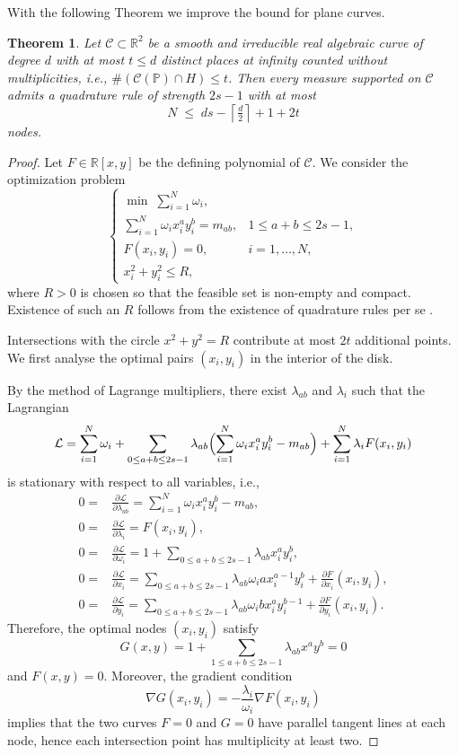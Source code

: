 \documentclass[11pt,a4paper]{amsart}
\numberwithin{equation}{section}
\newtheorem{thm}{Theorem}
\theoremstyle{definition}
\newcommand{\R}{\mathbb{R}}
\numberwithin{thm}{section}
\theoremstyle{break}
\numberwithin{subcase}{case}
\begin{document}
With the  following Theorem we improve the  bound for plane curves.

\begin{thm}\label{prop:planecurve}
Let $\mathcal{C}\subset \R^2$ be a smooth {and irreducible} real algebraic curve of degree $d$ with at most $t \leq d$ {distinct} places at infinity {counted without multiplicities, i.e., $\#(\mathcal C(\mathbb P)\cap H)\leq t$}. Then every measure supported on $\mathcal C$ admits a quadrature rule of strength $2s-1$ with at most
\[
N \;\le\; ds - \left\lceil \tfrac d2 \right\rceil + 1 + 2t
\]
nodes.
\end{thm}
\begin{proof}
Let $F \in \R[x,y]$ be the defining polynomial of $\mathcal{C}$. We consider the optimization problem
\[
\begin{cases}
\min \; \sum_{i=1}^N \omega_i, \\[2pt]
\sum_{i=1}^N \omega_i x_i^a y_i^b = m_{ab}, & 1 \le a+b \le 2s-1, \\
F(x_i,y_i)=0, & i=1,\dots,N, \\
x_i^2 + y_i^2 \le R,
\end{cases}
\]
where $R>0$ is chosen so that the feasible set is non-empty and compact.   
Existence of such an $R$  follows from the existence of quadrature rules per se \cite{richter1957parameterfreie}. 

Intersections with the circle $x^2+y^2=R$ contribute at most $2t$ additional points. We first analyse the optimal pairs $(x_i,y_i)$ in the interior of the disk.

By the method of Lagrange multipliers, there exist $\lambda_{ab}$ and $\lambda_i$ such that the Lagrangian  
\[
\mathcal{L} = \sum_{i=1}^N \omega_i 
+ \sum_{0\le a+b\le 2s-1} \lambda_{ab} \Bigl(\sum_{i=1}^N \omega_i x_i^a y_i^b - m_{ab}\Bigr) 
+ \sum_{i=1}^N \lambda_i F(x_i,y_i)
\]
is stationary with respect to all variables, i.e.,
{\begin{align*}
    0=&\frac{\partial \mathcal L}{\partial \lambda_{ab}}=\sum_{i=1}^N \omega_i x_i^a y_i^b - m_{ab}, \\    
    0=&\frac{\partial \mathcal L}{\partial \lambda_{i}}=F(x_i,y_i),\\
    0=&\frac{\partial \mathcal L}{\partial \omega_i}=1+\sum_{0\le a+b\le 2s-1} \lambda_{ab} x_i^a y_i^b,  \\
    0=&\frac{\partial \mathcal L}{\partial x_i}=\sum_{0\le a+b\le 2s-1} \lambda_{ab} \omega_i a x_i^{a-1} y_i^b+\frac{\partial F}{\partial x_i} (x_i,y_i),\\
    0=&\frac{\partial \mathcal L}{\partial y_i}=\sum_{0\le a+b\le 2s-1} \lambda_{ab} \omega_i b x_i^{a} y_i^{b-1}+\frac{\partial F}{\partial y_i} (x_i,y_i).
\end{align*}}
Therefore, the optimal nodes $(x_i,y_i)$ satisfy  
\[
G(x,y) = 1 + \sum_{1\le a+b\le 2s-1} \lambda_{ab} x^a y^b = 0
\]
and $F(x,y)=0$. Moreover, the gradient condition  
\[
\nabla G(x_i,y_i) = - \frac{\lambda_i}{\omega_i} \nabla F(x_i,y_i)
\]
implies that the two curves $F=0$ and $G=0$ have parallel tangent lines at each node, hence each intersection point has multiplicity at least two.  


\end{proof}
\end{document}
